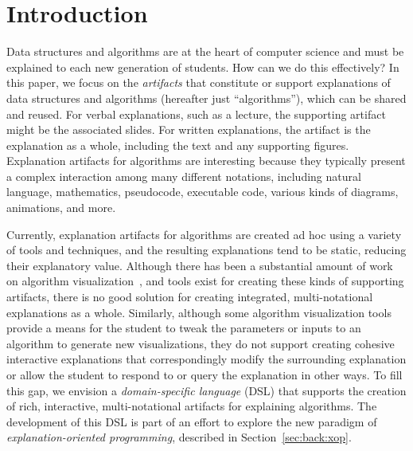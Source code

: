 \documentclass[sigconf]{acmart}
\begin{document}

\maketitle

\section{Introduction}
\label{sec:intro}

Data structures and algorithms are at the heart of computer science and must be
explained to each new generation of students. How can we do this effectively?
%
In this paper, we focus on the \emph{artifacts} that constitute or support
explanations of data structures and algorithms (hereafter just ``algorithms''),
which can be shared and reused.
%
For verbal explanations, such as a lecture, the supporting artifact might be
the associated slides. For written explanations, the artifact is the
explanation as a whole, including the text and any supporting figures.
%
Explanation artifacts for algorithms are interesting because they typically
present a complex interaction among many different notations, including natural
language, mathematics, pseudocode, executable code, various kinds of diagrams,
animations, and more.


Currently, explanation artifacts for algorithms are created ad hoc using a
variety of tools and techniques, and the resulting explanations tend to be
static, reducing their explanatory value.
%
Although there has been a substantial amount of work on algorithm
visualization~\cite{Gloor92,Gloor97,HDS02,shaffer2010algorithm,HANSEN2002291,KANN1997223},
and tools exist for creating these kinds of supporting artifacts, there is no
good solution for creating integrated, multi-notational explanations as a
whole. Similarly, although some algorithm visualization tools provide a means
for the student to tweak the parameters or inputs to an algorithm to generate
new visualizations, they do not support creating cohesive interactive
explanations that correspondingly modify the surrounding explanation or
allow the student to respond to or query the explanation in other ways.
%
To fill this gap, we envision a \emph{domain-specific language} (DSL) that
supports the creation of rich, interactive, multi-notational artifacts for
explaining algorithms.
%
The development of this DSL is part of an effort to explore the new paradigm of
\emph{explanation-oriented programming}, described in
Section~\ref{sec:back:xop}.
\end{document}
